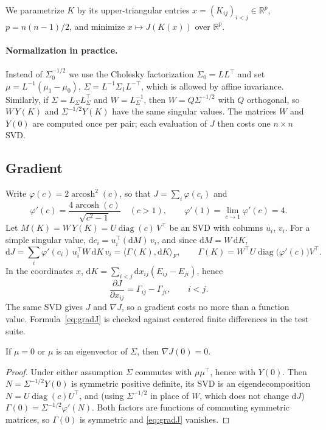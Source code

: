 We parametrize $K$ by its upper-triangular entries
$x=(K_{ij})_{i<j}\in\mathbb R^{p}$, $p=n(n-1)/2$, and minimize $x\mapsto J(K(x))$ over $\mathbb R^p$.

\paragraph{Normalization in practice.}
Instead of $\Sigma_0^{-1/2}$ we use the Cholesky factorization $\Sigma_0=LL^\top$ and set
$\mu=L^{-1}(\mu_1-\mu_0)$, $\Sigma=L^{-1}\Sigma_1L^{-\top}$, which is allowed by affine invariance.
Similarly, if $\Sigma=L_\Sigma L_\Sigma^\top$ and $W=L_\Sigma^{-1}$, then $W=Q\Sigma^{-1/2}$ with $Q$ orthogonal,
so $W\,Y(K)$ and $\Sigma^{-1/2}Y(K)$ have the same singular values.
The matrices $W$ and $Y(0)$ are computed once per pair; each evaluation of $J$ then costs
one $n\times n$ SVD.

\subsection{Gradient}

Write $\varphi(c)=2\operatorname{arcosh}^2(c)$, so that $J=\sum_i\varphi(c_i)$ and
\[
\varphi'(c)=\frac{4\operatorname{arcosh}(c)}{\sqrt{c^2-1}}\quad(c>1),\qquad \varphi'(1)=\lim_{c\to1}\varphi'(c)=4 .
\]
Let $M(K)=W\,Y(K)=U\operatorname{diag}(c)\,V^\top$ be an SVD with columns $u_i$, $v_i$.
For a simple singular value, $\mathrm dc_i=u_i^\top(\mathrm dM)\,v_i$, and since $\mathrm dM=W\,\mathrm dK$,
\[
\mathrm dJ=\sum_i\varphi'(c_i)\,u_i^\top W\,\mathrm dK\,v_i=\big\langle \Gamma(K),\mathrm dK\big\rangle_F,
\qquad
\Gamma(K)=W^\top U\operatorname{diag}\big(\varphi'(c)\big)V^\top .
\]
In the coordinates $x$, $\mathrm dK=\sum_{i<j}\mathrm dx_{ij}(E_{ij}-E_{ji})$, hence
\begin{equation}
\frac{\partial J}{\partial x_{ij}}=\Gamma_{ij}-\Gamma_{ji},\qquad i<j .
\label{eq:gradJ}
\end{equation}
The same SVD gives $J$ and $\nabla J$, so a gradient costs no more than a function value.
Formula~\eqref{eq:gradJ} is checked against centered finite differences in the test suite.

\begin{proposition}[A critical point at $K=0$]
If $\mu=0$ or $\mu$ is an eigenvector of $\Sigma$, then $\nabla J(0)=0$.
\end{proposition}

\begin{proof}
Under either assumption $\Sigma$ commutes with $\mu\mu^\top$, hence with $Y(0)$.
Then $N=\Sigma^{-1/2}Y(0)$ is symmetric positive definite, its SVD is an eigendecomposition
$N=U\operatorname{diag}(c)U^\top$, and (using $\Sigma^{-1/2}$ in place of $W$, which does not change $\mathrm dJ$)
$\Gamma(0)=\Sigma^{-1/2}\varphi'(N)$.
Both factors are functions of commuting symmetric matrices, so $\Gamma(0)$ is symmetric and
\eqref{eq:gradJ} vanishes.
\end{proof}

